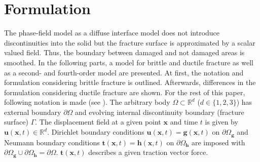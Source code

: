 \section{Formulation} \label{sec:formul}
The phase-field model as a diffuse interface model does not introduce discontinuities into the solid but the fracture surface is approximated by a scalar valued field. Thus, the boundary between damaged and not damaged areas is smoothed. In the following parts, a model for brittle and ductile fracture as well as a second- and fourth-order model are presented. At first, the notation and formulation considering brittle fracture is outlined. Afterwards, differences in the formulation considering ductile fracture are shown. For the rest of this paper, following notation is made (see ). The arbitrary body $\Omega\subset\mathbb{R}^{d}$ ($d\in\{1,2,3\}$) has external boundary $\partial\Omega$ and evolving internal discontinuity boundary (fracture surface) $\Gamma$. The displacement field at a given point $\mathbf{x}$ and time $t$ is given by $\mathbf{u}\left(\mathbf{x},t\right)\in\mathbb{R}^{d}$. Dirichlet boundary conditions $\mathbf{u}\left(\mathbf{x},t\right)=\mathbf{g}\left(\mathbf{x},t\right)$ on $\partial\Omega_{\mathbf{g}}$ and Neumann boundary conditions $\mathbf{t}\left(\mathbf{x},t\right)=\mathbf{h}\left(\mathbf{x},t\right)$ on $\partial\Omega_{\mathbf{h}}$ are imposed with $\partial\Omega_{\mathbf{g}}\cup\partial\Omega_{\mathbf{h}}=\partial\Omega$. $\mathbf{t}\left(\mathbf{x},t\right)$ describes a given traction vector force.
